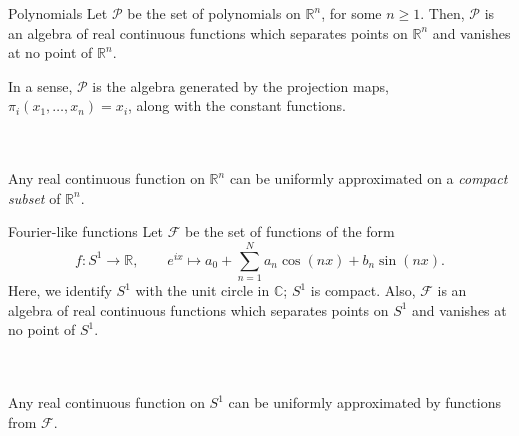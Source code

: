 \documentclass{beamer}
\def\C{\mathbb{C}}
\def\R{\mathbb{R}}
\begin{document}
    \begin{frame}{Polynomials}
        Let $\mathscr{P}$ be the set of polynomials on $\R^n$, for some $n \geq 1$.
        Then, $\mathscr{P}$ is an algebra of real continuous functions which
        separates points on $\R^n$ and vanishes at no point of $\R^n$.

        In a sense, $\mathscr{P}$ is the algebra generated by the projection maps,
        $\pi_i(x_1, \dots, x_n) = x_i$, along with the constant functions.

        \\~\\

        Any real continuous function on $\R^n$ can be uniformly approximated on a
        \emph{compact subset} of $\R^n$.
    \end{frame}

    \begin{frame}{Fourier-like functions}
        Let $\mathscr{F}$ be the set of functions of the form \[
            f\colon S^1 \to \R, \qquad e^{ix} \mapsto a_0 + \sum_{n = 1}^N a_n\cos(nx) +
            b_n \sin(nx).
        \] Here, we identify $S^1$ with the unit circle in $\C$; $S^1$ is compact.
        Also, $\mathscr{F}$ is an algebra of real continuous functions which
        separates points on $S^1$ and vanishes at no point of $S^1$.

        \\~\\

        Any real continuous function on $S^1$ can be uniformly approximated by
        functions from $\mathscr{F}$.
    \end{frame}
\end{document}

